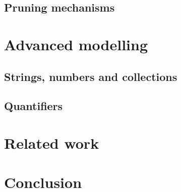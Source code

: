\subsection{Pruning mechanisms}

\section{Advanced modelling}

\subsection{Strings, numbers and collections}

\subsection{Quantifiers}

\section{Related work}

\section{Conclusion}

